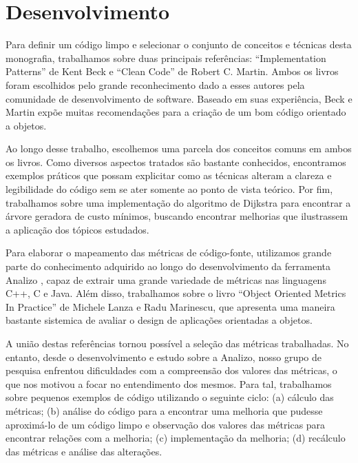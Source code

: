 \section{Desenvolvimento}
\label{sec:desenvolvimento}

Para definir um código limpo e selecionar o conjunto de conceitos e técnicas desta monografia, trabalhamos sobre duas principais referências: 
``Implementation Patterns'' \citep{Beck2007} de Kent Beck e ``Clean Code'' \citep{Martin2008} de Robert C. Martin. Ambos os livros foram escolhidos 
pelo grande reconhecimento dado a esses autores pela comunidade de desenvolvimento de software. Baseado em suas experiência, Beck e Martin 
expõe muitas recomendações para a criação de um bom código orientado a objetos.

Ao longo desse trabalho, escolhemos uma parcela dos conceitos comuns em ambos os livros. Como diversos aspectos tratados são bastante 
conhecidos, encontramos exemplos práticos que possam explicitar como as técnicas alteram a clareza e legibilidade do código sem se ater 
somente ao ponto de vista teórico. Por fim, trabalhamos sobre uma implementação do algoritmo de Dijkstra para encontrar a árvore geradora de 
custo mínimos, buscando encontrar melhorias que ilustrassem a aplicação dos tópicos estudados.

Para elaborar o mapeamento das métricas de código-fonte, utilizamos grande parte do conhecimento adquirido ao longo do desenvolvimento da 
ferramenta Analizo \cite{analizo2010} \cite{analizo_homepage}, capaz de extrair uma grande variedade de métricas nas linguagens C++, C e Java. Além disso, trabalhamos sobre o 
livro ``Object Oriented Metrics In Practice'' \cite{Lanza06} de Michele Lanza e Radu Marinescu, que apresenta uma maneira bastante sistemica de avaliar o design de aplicações orientadas a objetos. 

A união destas referências tornou possível a seleção das métricas trabalhadas. No entanto, desde o desenvolvimento e estudo sobre a Analizo, nosso grupo de pesquisa enfrentou dificuldades com a compreensão dos valores das métricas, o que nos motivou a focar no entendimento dos mesmos. Para tal, trabalhamos sobre pequenos exemplos de código utilizando o seguinte ciclo: (a) cálculo das métricas; (b) análise do código para a encontrar uma melhoria que pudesse aproximá-lo de um código limpo e observação dos valores das métricas para encontrar relações com a melhoria; (c) implementação da melhoria; (d) recálculo das métricas e análise das alterações.

